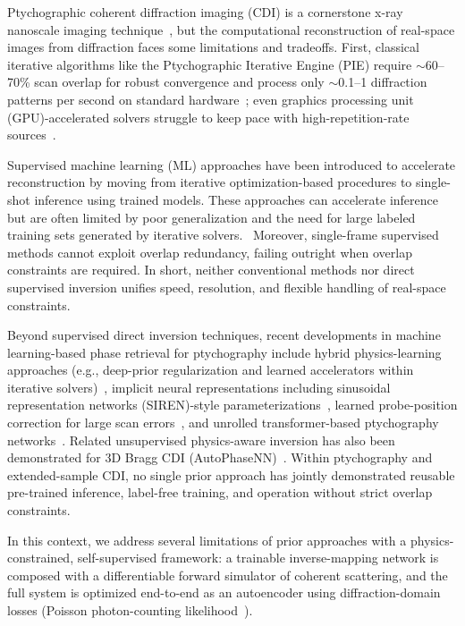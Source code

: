 \documentclass{optica-article}
\begin{document}
Ptychographic coherent diffraction imaging (CDI) is a cornerstone x-ray nanoscale imaging technique~\cite{GuizarSicairos2021PhysicsToday}, but the computational reconstruction of real-space images from diffraction faces some limitations and tradeoffs. First, classical iterative algorithms like the Ptychographic Iterative Engine (PIE) require $\sim$60--70\% scan overlap for robust convergence and process only $\sim$0.1--1 diffraction patterns per second on standard hardware~\cite{Bunk2008Overlap,Maiden2009UltramicroscopyPIE}; even graphics processing unit (GPU)-accelerated solvers struggle to keep pace with high-repetition-rate sources~\cite{Marchesini2016SHARP,Babu2023EdgePtycho}. 

Supervised machine learning (ML) approaches have been introduced to accelerate reconstruction by moving from iterative optimization-based procedures to single-shot inference using trained models. These approaches can accelerate inference but are often limited by poor generalization and the need for large labeled training sets generated by iterative solvers.~\cite{Cherukara2020PtychoNN,Babu2023EdgePtycho}  Moreover, single-frame supervised methods cannot exploit overlap redundancy, failing outright when overlap constraints are required. In short, neither conventional methods nor direct supervised inversion unifies speed, resolution, and flexible handling of real-space constraints.

Beyond supervised direct inversion techniques, recent developments in machine learning-based phase retrieval for ptychography include hybrid physics-learning approaches (e.g., deep-prior regularization and learned accelerators within iterative solvers)~\cite{Metzler2018prDeep,McCray2025IntegratedNN}, implicit neural representations including sinusoidal representation networks (SIREN)-style parameterizations~\cite{Sitzmann2020SIREN}, learned probe-position correction for large scan errors~\cite{Du2024ProbePosition}, and unrolled transformer-based ptychography networks~\cite{Gan2024PtychoDV}. Related unsupervised physics-aware inversion has also been demonstrated for 3D Bragg CDI (AutoPhaseNN)~\cite{Yao2022AutoPhaseNN}. Within ptychography and extended-sample CDI, no single prior approach has jointly demonstrated reusable pre-trained inference, label-free training, and operation without strict overlap constraints.

In this context, we address several limitations of prior approaches with a physics-constrained, self-supervised framework: a trainable inverse-mapping network is composed with a differentiable forward simulator of coherent scattering, and the full system is optimized end-to-end as an autoencoder using diffraction-domain losses (Poisson photon-counting likelihood~\cite{Thibault2012NJPML,Seifert2023PoissonGaussian}).
\end{document}
